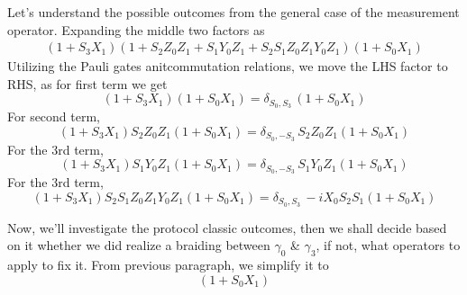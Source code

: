 \documentclass{article}
\begin{document}
\vspace{12pt}
Let's understand the possible outcomes from the general case of the measurement operator. Expanding the middle two factors as
$$
	\begin{aligned}
		(1 +S_3 X_1) (1 + S_2 Z_0 Z_1 + S_1 Y_0 Z_1 + S_2 S_1 Z_0 Z_1 Y_0 Z_1) (1 +S_0 X_1)
		\label{eq:expanding}
	\end{aligned}
$$
Utilizing the Pauli gates anitcommutation relations, we move the LHS factor to RHS,
as for first term we get
\begin{equation*}
	(1 +S_3 X_1) (1 +S_0 X_1) = \delta_{S_0,S_3}\, (1 +S_0 X_1)
\end{equation*}
For second term,
\begin{equation*}
	(1 +S_3 X_1) S_2 Z_0 Z_1 (1 +S_0 X_1) = \delta_{S_0,-S_3}\, S_2 Z_0 Z_1 (1 +S_0 X_1)
\end{equation*}
For the 3rd term,
\begin{equation*}
	(1 +S_3 X_1) S_1 Y_0 Z_1 (1 +S_0 X_1) = \delta_{S_0,-S_3}\, S_1 Y_0 Z_1 (1 +S_0 X_1)
\end{equation*}
For the 3rd term,
\begin{equation*}
	(1 +S_3 X_1) S_2 S_1 Z_0 Z_1 Y_0 Z_1 (1 +S_0 X_1) = \delta_{S_0,S_3}\, -i X_0 S_2 S_1 (1 +S_0 X_1)
\end{equation*}

Now, we'll investigate the protocol classic outcomes, then we shall decide based on it whether
we did realize a braiding between $ \gamma_0 $ \& $ \gamma_3 $, if not, what operators
to apply to fix it. From previous paragraph, we simplify it to
\begin{equation*}
	[
		\delta_{S_0,S_3} + \delta_{S_0,-S_3}\, S_2 Z_0 Z_1
		+ \delta_{S_0,-S_3}\, S_1 Y_0 Z_1 + \delta_{S_0,S_3}\, -i X_0 S_2 S_1
	] (1 +S_0 X_1)
\end{equation*}
\end{document}
